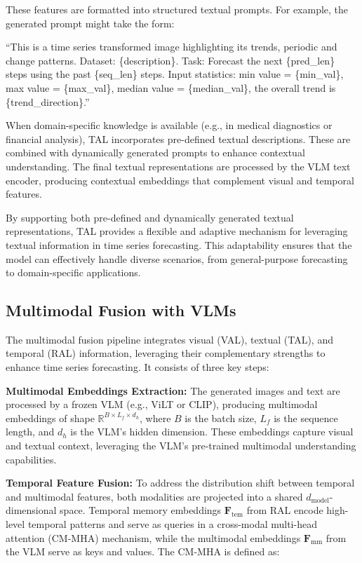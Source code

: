 These features are formatted into structured textual prompts. For example, the generated prompt might take the form:

``This is a time series transformed image highlighting its trends, periodic and change patterns. Dataset: \{description\}. Task: Forecast the next \{pred\_len\} steps using the past \{seq\_len\} steps. Input statistics: min value = \{min\_val\}, max value = \{max\_val\}, median value = \{median\_val\}, the overall trend is \{trend\_direction\}.''

When domain-specific knowledge is available (e.g., in medical diagnostics or financial analysis), TAL incorporates pre-defined textual descriptions. These are combined with dynamically generated prompts to enhance contextual understanding. The final textual representations are processed by the VLM text encoder, producing contextual embeddings that complement visual and temporal features.

By supporting both pre-defined and dynamically generated textual representations, TAL provides a flexible and adaptive mechanism for leveraging textual information in time series forecasting. This adaptability ensures that the model can effectively handle diverse scenarios, from general-purpose forecasting to domain-specific applications.

\subsection{Multimodal Fusion with VLMs}

The multimodal fusion pipeline integrates visual (VAL), textual (TAL), and temporal (RAL) information, leveraging their complementary strengths to enhance time series forecasting. It consists of three key steps:

\noindent\textbf{Multimodal Embeddings Extraction:} The generated images and text are processed by a frozen VLM (e.g., ViLT or CLIP), producing multimodal embeddings of shape \( \mathbb{R}^{B \times L_f \times d_h} \), where \( B \) is the batch size, \( L_f \) is the sequence length, and \( d_h \) is the VLM's hidden dimension. These embeddings capture visual and textual context, leveraging the VLM's pre-trained multimodal understanding capabilities.

\noindent\textbf{Temporal Feature Fusion:} To address the distribution shift between temporal and multimodal features, both modalities are projected into a shared \( d_{\text{model}} \)-dimensional space. Temporal memory embeddings \( \mathbf{F}_{\text{tem}} \) from RAL encode high-level temporal patterns and serve as queries in a cross-modal multi-head attention (CM-MHA) mechanism, while the multimodal embeddings \( \mathbf{F}_{\text{mm}} \) from the VLM serve as keys and values. The CM-MHA is defined as:

